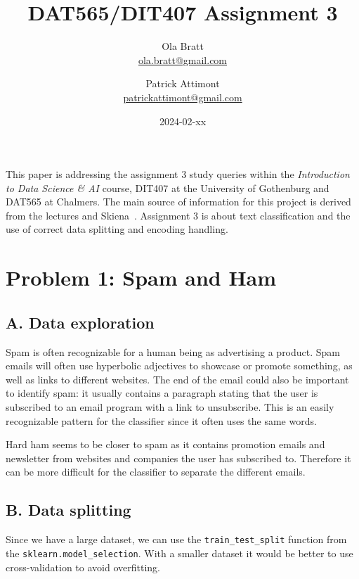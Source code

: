 \documentclass[a4paper]{article}
\begin{document}
\author{Ola Bratt \\
  \href{mailto:ola.bratt@gmail.com}{ola.bratt@gmail.com}
  \and
  Patrick Attimont \\
  \href{patrickattimont@gmail.com}{patrickattimont@gmail.com}
}

\title{DAT565/DIT407 Assignment 3}
\date{2024-02-xx}

\maketitle

This paper is addressing the assignment 3 study queries within the \emph{Introduction to Data Science \& AI} course, DIT407 at 
the University of Gothenburg and DAT565 at Chalmers. The main source of information for this project
is derived from the lectures and Skiena~\cite{Skiena:2024}. Assignment 3 is about text classification and the 
use of correct data splitting and encoding handling.

\section*{Problem 1: Spam and Ham}

\subsection*{A. Data exploration}
Spam is often recognizable for a human being as advertising a product.
Spam emails will often use hyperbolic adjectives to showcase or promote something, as well as links to different websites.
The end of the email could also be important to identify spam: it usually contains a paragraph stating that the user is subscribed to an email program with a link to unsubscribe.
This is an easily recognizable pattern for the classifier since it often uses the same words.

Hard ham seems to be closer to spam as it contains promotion emails and newsletter from websites and companies the user has subscribed to.
Therefore it can be more difficult for the classifier to separate the different emails.

\subsection*{B. Data splitting}
Since we have a large dataset, we can use the \texttt{train\_test\_split} function from the \texttt{sklearn.model\_selection}. With a smaller
dataset it would be better to use cross-validation to avoid overfitting.
\end{document}
